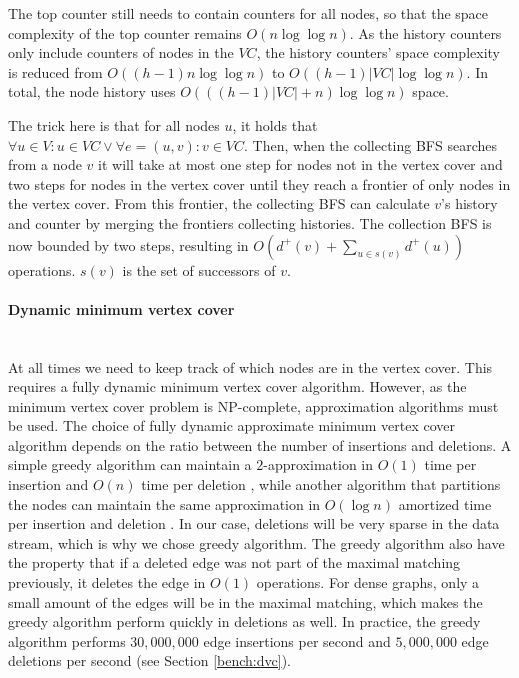 The top counter still needs to contain counters for all nodes, so that the space complexity of the top counter remains $O(n\log \log n)$. As the history counters only include counters of nodes in the $VC$, the history counters' space complexity is reduced from $O((h-1)n \log \log n)$ to $O((h-1)|VC| \log \log n)$. In total, the node history uses $O(((h-1)|VC| + n )\log \log n)$ space.

The trick here is that for all nodes $u$, it holds that $\forall u \in V: u \in VC \vee \forall e = (u,v) : v \in VC$. Then, when the collecting BFS searches from a node $v$ it will take at most one step for nodes not in the vertex cover and two steps for nodes in the vertex cover until they reach a frontier of only nodes in the vertex cover. From this frontier, the collecting BFS can calculate $v$'s history and counter by merging the frontiers collecting histories. The collection BFS is now bounded by two steps, resulting in $O(d^+(v) + \sum_{u \in s(v)}{d^+(u)})$ operations. $s(v)$ is the set of successors of $v$.

\paragraph{Dynamic minimum vertex cover} \mbox{} \\
At all times we need to keep track of which nodes are in the vertex cover. This requires a fully dynamic minimum vertex cover algorithm. However, as the minimum vertex cover problem is NP-complete, approximation algorithms must be used. The choice of fully dynamic approximate minimum vertex cover algorithm depends on the ratio between the number of insertions and deletions. A simple greedy algorithm can maintain a $2$-approximation in $O(1)$ time per insertion and $O(n)$ time per deletion \cite{2appdynvc}, while another algorithm that partitions the nodes can maintain the same approximation in $O(\log n )$ amortized time per insertion and deletion \cite{2appdynvclogn}. In our case, deletions will be very sparse in the data stream, which is why we chose greedy algorithm. The greedy algorithm also have the property that if a deleted edge was not part of the maximal matching previously, it deletes the edge in $O(1)$ operations. For dense graphs, only a small amount of the edges will be in the maximal matching, which makes the greedy algorithm perform quickly in deletions as well. In practice, the greedy algorithm performs $30,000,000$ edge insertions per second and $5,000,000$ edge deletions per second (see Section \ref{bench:dvc}).
 
